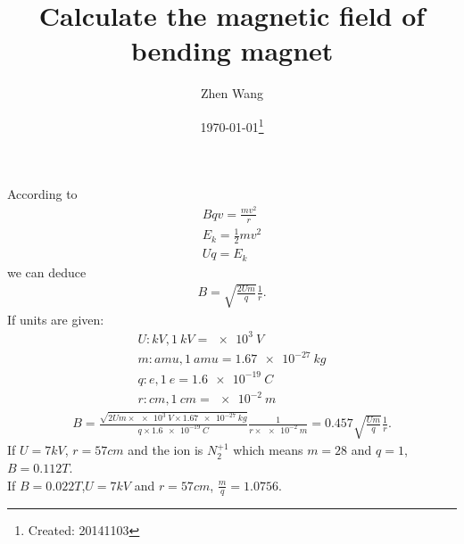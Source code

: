 \documentclass[letterpaper,11pt,pdftex]{article}
\title{Calculate the magnetic field of bending magnet }
\author{Zhen Wang}
\date{\today\footnote{Created: 20141103}}
\begin{document}
\maketitle

According to 
\begin{align}
    \label{eq:1}
    Bqv = \frac{m{v}^{2}}{r} \\ 
    {E}_{k} = \frac{1}{2}m{v}^{2} \\
    Uq = {E}_{k}
\end{align}
we can deduce
\begin{align}
    \label{eq:2}
    B = \sqrt{\frac{2Um}{q}}\frac{1}{r}.
\end{align} 
If units are given:
\begin{align}
    U : \si{kV},   \SI{1}{kV} = \SI{e3}{V} \\ 
    m : \si{amu},  \SI{1}{amu} = \SI{1.67e-27}{kg} \\ 
    q : \si{e}, \SI{1}{e} = \SI{1.6e-19}{C} \\ 
    r : \si{cm}, \SI{1}{cm} = \SI{e-2}{m}
\end{align}
\begin{align}
    B = \frac{\sqrt{2Um\times\SI{e3}{V}\times\SI{1.67e-27}{kg}}}{q\times\SI{1.6e-19}{C}}\frac{1}{r\times\SI{e-2}{m}} 
      = 0.457\sqrt{\frac{Um}{q}}\frac{1}{r}.
\end{align}
If $U = 7\si{kV}$, $r = 57\si{cm}$ and the ion is $N^{+1}_{2}$ which means $m = 28$ and $ q = 1$, $B =  0.112\si{T}$.\\ 
If $B =  0.022\si{T}$,$U = 7\si{kV}$ and $r = 57\si{cm}$, $\frac{m}{q} = 1.0756$.

\renewcommand{\bibname}{Bibliography}

% 
\end{document}
